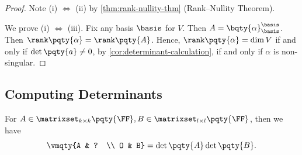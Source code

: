 \begin{proof}
    Note (i) \(\iff\) (ii) by \autoref{thm:rank-nullity-thm} (Rank--Nullity Theorem).

    We prove (i) \(\iff\) (iii). Fix any basis \(\basis\) for \(V\). Then \(A = \bqty{\alpha}_{\basis}^{\basis}\). Then \(\rank\pqty{\alpha} = \rank\pqty{A}\). Hence, \(\rank\pqty{\alpha} = \dim V\) if and only if \(\det \pqty{a} \neq 0\), by \autoref{cor:determinant-calculation}, if and only if \(\alpha\) is non-singular.
\end{proof}

\subsection{Computing Determinants}

\begin{proposition}
    For \(A \in \matrixset_{k \times k} \pqty{\FF}, B \in \matrixset_{l \times l} \pqty{\FF}\), then we have
    \[
        \vmqty{A & ? \\ O & B} = \det\pqty{A} \det\pqty{B}.
    \]
\end{proposition}

